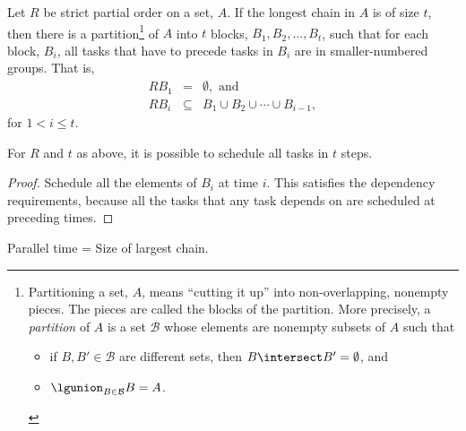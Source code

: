 \begin{theorem}\label{thm:parallel}
Let $R$ be strict partial order on a set, $A$.  If the longest chain in
$A$ is of size $t$, then there is a partition\footnote{Partitioning a set,
$A$, means ``cutting it up'' into non-overlapping, nonempty pieces.  The
pieces are called the blocks of the partition.  More precisely, a
\emph{partition} of $A$ is a set $\mathcal{B}$ whose elements are nonempty
subsets of $A$ such that
\begin{itemize}
\item if $B,B' \in \mathcal{B}$ are different sets, then $B \intersect B' =
 \emptyset$, and
\item $\lgunion_{B\in \mathcal{B}} B = A$.
\end{itemize}}
of $A$ into $t$ blocks,
$B_1, B_2, \dots, B_t$, such that for each block, $B_i$, all tasks that
have to precede tasks in $B_i$ are in smaller-numbered groups.  That is,
\begin{eqnarray}
RB_1 & = & \emptyset,\text{ and}\label{RA1}\\
RB_i & \subseteq & B_1 \cup B_2 \cup \cdots \cup B_{i-1},\label{RAi}
\end{eqnarray}
for $1<i\le t$.
\end{theorem}

\begin{corollary}
For $R$ and $t$ as above, it is possible to schedule all tasks in $t$
steps.
\end{corollary}

\begin{proof}
Schedule all the elements of $B_i$ at time $i$.  This satisfies the
dependency requirements, because all the tasks that any task depends on
are scheduled at preceding times.
\end{proof}

\begin{corollary}
Parallel time = Size of largest chain.
\end{corollary}

